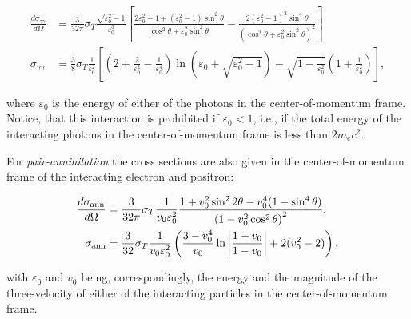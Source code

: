 \begin{equation}
    \begin{aligned}
        \frac{d \sigma_{\gamma\gamma}}{d\Omega} &= \frac{3}{32\pi} \sigma_T 
            \frac{\sqrt{\varepsilon_0^2-1}}{\varepsilon_0^3}
            \left[
                \frac{2 \varepsilon_0^2 -1 + (\varepsilon_0^2 - 1)\sin^2{\theta}}{\cos^2{\theta} + \varepsilon_0^2\sin^2{\theta}}
                - \frac{2(\varepsilon_0^2 - 1)^2\sin^4{\theta}}{\left(\cos^2{\theta}+\varepsilon_0^2 \sin^2{\theta}\right)^2}
            \right] \\
        \sigma_{\gamma\gamma} &= \frac{3}{8}\sigma_T \frac{1}{\varepsilon_0^2}\left[
            \left(2 + \frac{2}{\varepsilon_0^2} - \frac{1}{\varepsilon_0^4}\right)\ln{\left(\varepsilon_0 + \sqrt{\varepsilon_0^2 - 1}\right)} - 
            \sqrt{1 - \frac{1}{\varepsilon_0^2}}\left(1 + \frac{1}{\varepsilon_0^2}\right)
        \right],
    \end{aligned}
\end{equation}

\noindent where $\varepsilon_0$ is the energy of either of the photons in the center-of-momentum frame. Notice, that this interaction is prohibited if $\varepsilon_0 < 1$, i.e., if the total energy of the interacting photons in the center-of-momentum frame is less than $2m_e c^2$.

For \emph{pair-annihilation} the cross sections are also given in the center-of-momentum frame of the interacting electron and positron:

\begin{equation}
    \begin{aligned}
        \frac{d \sigma_{\rm ann}}{d\Omega} &= \frac{3}{32\pi} \sigma_T \frac{1}{v_0 \varepsilon_0^2}
        \frac{1+v_0^2\sin^2{2\theta} - v_0^4(1 - \sin^4{\theta})}{\left(1 - v_0^2\cos^2{\theta}\right)^2 },\\
        \sigma_{\rm ann} &= \frac{3}{32}\sigma_T \frac{1}{v_0\varepsilon_0^2}
        \left(
            \frac{3-v_0^4}{v_0} \ln{\left|\frac{1+v_0}{1-v_0}\right| + 2(v_0^2 - 2)}
        \right)
        ,
    \end{aligned}
\end{equation}

\noindent with $\varepsilon_0$ and $v_0$ being, correspondingly, the energy and the magnitude of the three-velocity of either of the interacting particles in the center-of-momentum frame.